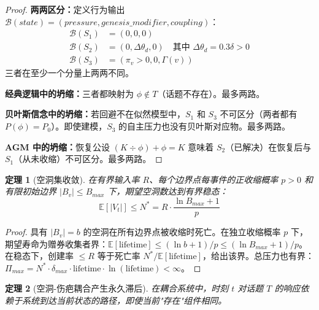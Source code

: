 \documentclass[11pt]{article}
\newtheorem{theorem}{定理}[section]
\begin{document}
\begin{proof}
\textbf{两两区分：}定义行为输出 $\mathcal{B}(state) = (pressure, genesis\_modifier, coupling)$：
\begin{align}
\mathcal{B}(S_1) &= (0, 0, 0) \\
\mathcal{B}(S_2) &= (0, \Delta\theta_d, 0) \quad \text{其中 } \Delta\theta_d = 0.3\delta > 0 \\
\mathcal{B}(S_3) &= (\pi_v > 0, 0, \Gamma(v))
\end{align}
三者在至少一个分量上两两不同。

\textbf{经典逻辑中的坍缩：}三者都映射为 $\phi \notin T$（话题不存在）。最多两路。

\textbf{贝叶斯信念中的坍缩：}若回避不在似然模型中，$S_1$ 和 $S_3$ 不可区分（两者都有 $P(\phi) = P_0$）。即使建模，$S_3$ 的自主压力也没有贝叶斯对应物。最多两路。

\textbf{AGM 中的坍缩：}恢复公设 $(K \div \phi) + \phi = K$ 意味着 $S_2$（已解决）在恢复后与 $S_1$（从未收缩）不可区分。最多两路。
\end{proof}

\begin{theorem}[空洞集收敛]
\label{thm:void-convergence}
在有界输入率 $R$、每个边界点每事件的正收缩概率 $p > 0$ 和有限初始边界 $|B_v| \leq B_{max}$ 下，期望空洞数达到有界稳态：
\begin{equation}
\mathbb{E}[|V_t|] \leq N^* = R \cdot \frac{\ln B_{max} + 1}{p}
\end{equation}
\end{theorem}

\begin{proof}
具有 $|B_v| = b$ 的空洞在所有边界点被收缩时死亡。在独立收缩概率 $p$ 下，期望寿命为赠券收集者界：$\mathbb{E}[\text{lifetime}] \leq (\ln b + 1)/p \leq (\ln B_{max} + 1)/p$。在稳态下，创建率 $\leq R$ 等于死亡率 $N^*/\mathbb{E}[\text{lifetime}]$，给出该界。总压力也有界：$\Pi_{max} = N^* \cdot \delta_{max} \cdot \text{lifetime} \cdot \ln(\text{lifetime}) < \infty$。
\end{proof}

\begin{theorem}[空洞-伤疤耦合产生永久滞后]
\label{thm:void-hysteresis}
在耦合系统中，时刻 $t$ 对话题 $T$ 的响应依赖于系统到达当前状态的路径，即使当前"存在"组件相同。
\end{theorem}
\end{document}
